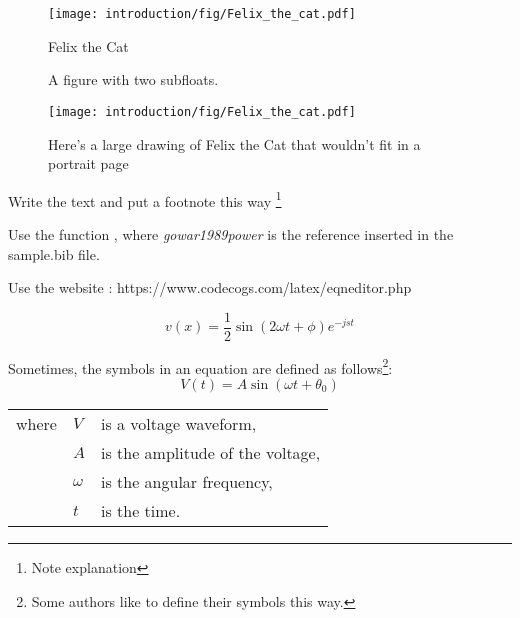 

\begin{figure}[tb]
\centering
\texttt{[image: introduction/fig/Felix\_the\_cat.pdf]}
\caption{Felix the Cat}
\label{fig:felix}
\end{figure}



\begin{figure}[tb]
	\centering
	\caption{A figure with two subfloats.}
	\label{fig:fig2}
\end{figure}



\begin{landscape}
	\begin{figure}[H]
\centering
\texttt{[image: introduction/fig/Felix\_the\_cat.pdf]}
\caption{Here's a large drawing of Felix the Cat that wouldn't fit in a portrait page}
\label{fig:felix2}
\end{figure}
\end{landscape}



Write the text and put a footnote this way \footnote{Note explanation}


Use the function \cite{gowar1989power}, where \emph{gowar1989power} is the reference inserted in the sample.bib file.


Use the website : https://www.codecogs.com/latex/eqneditor.php

\begin{equation}
v(x)=\frac{1}{2}\sin(2 \omega t + \phi) e^{-j s t}
\label{eq:cacona}
\end{equation}

\begin{samepage}
Sometimes, the symbols in an equation are defined as follows\footnote{Some authors like to define their symbols this way.}:
\begin{equation}
	V(t)=A \sin(\omega t+\theta_0)
\end{equation}
\begin{tabular}{lll}
	where & $V$ & is a voltage waveform,\\
	& $A$ & is the amplitude of the voltage,\\
	& $\omega$ & is the angular frequency,\\
	& $t$ & is the time.
\end{tabular}
\end{samepage}

